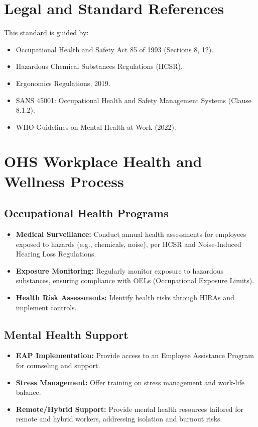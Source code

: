 \documentclass[11pt]{article}
\begin{document}
\section{Legal and Standard References}
This standard is guided by:
\begin{itemize}
    \item Occupational Health and Safety Act 85 of 1993 (Sections 8, 12).
    \item Hazardous Chemical Substances Regulations (HCSR).
    \item Ergonomics Regulations, 2019.
    \item SANS 45001: Occupational Health and Safety Management Systems (Clause 8.1.2).
    \item WHO Guidelines on Mental Health at Work (2022).
\end{itemize}

\section{OHS Workplace Health and Wellness Process}

\subsection{Occupational Health Programs}
\begin{itemize}
    \item \textbf{Medical Surveillance:} Conduct annual health assessments for employees exposed to hazards (e.g., chemicals, noise), per HCSR and Noise-Induced Hearing Loss Regulations.
    \item \textbf{Exposure Monitoring:} Regularly monitor exposure to hazardous substances, ensuring compliance with OELs (Occupational Exposure Limits).
    \item \textbf{Health Risk Assessments:} Identify health risks through HIRAs and implement controls.
\end{itemize}

\subsection{Mental Health Support}
\begin{itemize}
    \item \textbf{EAP Implementation:} Provide access to an Employee Assistance Program for counseling and support.
    \item \textbf{Stress Management:} Offer training on stress management and work-life balance.
    \item \textbf{Remote/Hybrid Support:} Provide mental health resources tailored for remote and hybrid workers, addressing isolation and burnout risks.
\end{itemize}
\end{document}
